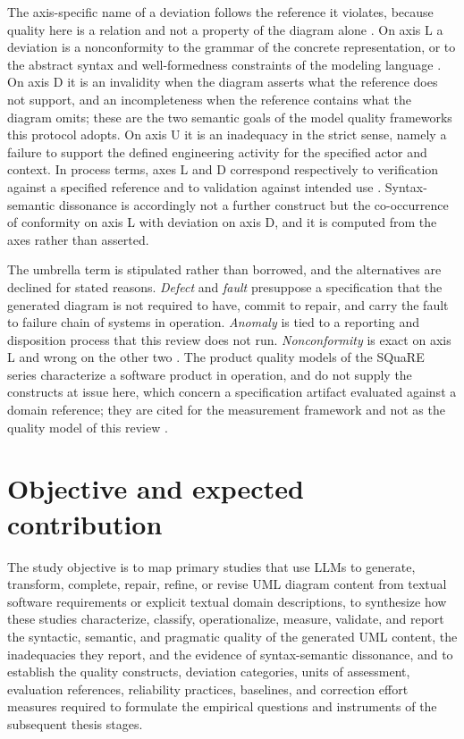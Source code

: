 The axis-specific name of a deviation follows the reference it violates, because quality here is a relation and not a property of the diagram alone \cite{Lindland1994Quality,Krogstie2006Process}. On axis L a deviation is a nonconformity to the grammar of the concrete representation, or to the abstract syntax and well-formedness constraints of the modeling language \cite{OMG2017UML}. On axis D it is an invalidity when the diagram asserts what the reference does not support, and an incompleteness when the reference contains what the diagram omits; these are the two semantic goals of the model quality frameworks this protocol adopts. On axis U it is an inadequacy in the strict sense, namely a failure to support the defined engineering activity for the specified actor and context. In process terms, axes L and D correspond respectively to verification against a specified reference and to validation against intended use \cite{ISO12207}. Syntax-semantic dissonance is accordingly not a further construct but the co-occurrence of conformity on axis L with deviation on axis D, and it is computed from the axes rather than asserted.

The umbrella term is stipulated rather than borrowed, and the alternatives are declined for stated reasons. \textit{Defect} and \textit{fault} presuppose a specification that the generated diagram is not required to have, commit to repair, and carry the fault to failure chain of systems in operation. \textit{Anomaly} is tied to a reporting and disposition process that this review does not run. \textit{Nonconformity} is exact on axis L and wrong on the other two \cite{ISO24765,IEEE1044}. The product quality models of the SQuaRE series characterize a software product in operation, and do not supply the constructs at issue here, which concern a specification artifact evaluated against a domain reference; they are cited for the measurement framework and not as the quality model of this review \cite{ISO25010,ISO25020}.


\section{Objective and expected contribution}
\label{sec:protocol_objective}

The study objective is to map primary studies that use LLMs to generate, transform, complete, repair, refine, or revise UML diagram content from textual software requirements or explicit textual domain descriptions, to synthesize how these studies characterize, classify, operationalize, measure, validate, and report the syntactic, semantic, and pragmatic quality of the generated UML content, the inadequacies they report, and the evidence of syntax-semantic dissonance, and to establish the quality constructs, deviation categories, units of assessment, evaluation references, reliability practices, baselines, and correction effort measures required to formulate the empirical questions and instruments of the subsequent thesis stages.

